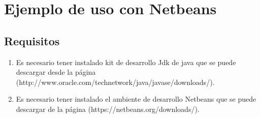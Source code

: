\chapter{Ejemplo de uso con Netbeans}



	\section{Requisitos}

	\begin{enumerate}

		\item Es necesario tener instalado kit de desarrollo Jdk de java que se puede descargar desde la página (http://www.oracle.com/technetwork/java/javase/downloads/).

		\item Es necesario tener instalado el ambiente de desarrollo Netbeans que se puede descargar de la página (https://netbeans.org/downloads/).
		\end{enumerate}


